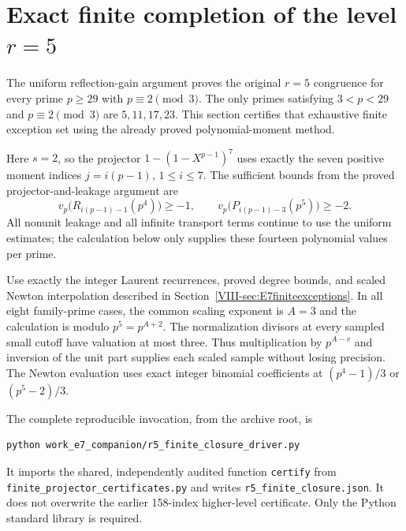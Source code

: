 \documentclass[11pt,letterpaper]{article}
\numberwithin{equation}{section}
\begin{document}
\section{Exact finite completion of the level \texorpdfstring{$r=5$}{r=5}}\label{loc-VIII-13}
\label{VIII-sec:E7r5finite}
The uniform reflection-gain argument proves the original $r=5$
congruence for every prime $p\ge29$ with $p\equiv2\pmod3$.
The only primes satisfying $3<p<29$ and $p\equiv2\pmod3$ are
$5,11,17,23$. This section certifies that exhaustive finite exception
set using the already proved polynomial-moment method.

Here $s=2$, so the projector $1-(1-X^{p-1})^7$ uses exactly the
seven positive moment indices $j=i(p-1)$, $1\le i\le7$.
The sufficient bounds from the proved projector-and-leakage argument are
\[
 v_p\bigl(R_{i(p-1)-1}(p^4)\bigr)\ge-1,
 \qquad
 v_p\bigl(P_{i(p-1)-3}(p^5)\bigr)\ge-2.
\]
All nonunit leakage and all infinite transport terms continue to use
the uniform estimates; the calculation below only supplies these
fourteen polynomial values per prime.

Use exactly the integer Laurent recurrences, proved degree bounds,
and scaled Newton interpolation described in
Section~\ref{VIII-sec:E7finiteexceptions}. In all eight family-prime cases,
the common scaling exponent is $A=3$ and the calculation is modulo
$p^5=p^{A+2}$. The normalization divisors at every sampled small cutoff
have valuation at most three. Thus multiplication by $p^{A-v}$ and
inversion of the unit part supplies each scaled sample without losing
precision. The Newton evaluation uses exact integer binomial
coefficients at $(p^4-1)/3$ or $(p^5-2)/3$.

The complete reproducible invocation, from the archive root, is
\begin{verbatim}
python work_e7_companion/r5_finite_closure_driver.py
\end{verbatim}
It imports the shared, independently audited function
\texttt{certify} from \nolinkurl{finite_projector_certificates.py}
and writes \nolinkurl{r5_finite_closure.json}. It does not overwrite
the earlier 158-index higher-level certificate. Only the Python
standard library is required.
\end{document}
